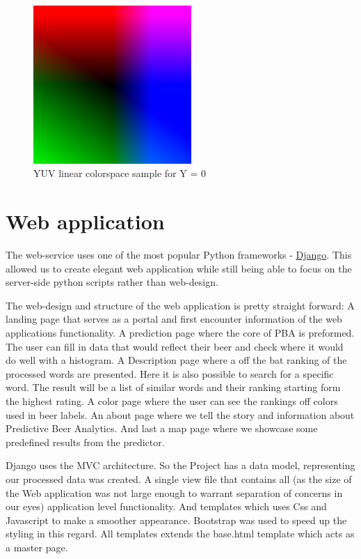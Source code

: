 \documentclass[10pt]{IEEEtran}
\begin{document}
\begin{figure}[t]
  \centering
  \includegraphics[width=6cm]{./graphics/YUV.png}
  \caption{YUV linear colorspace sample for Y = 0}
  \label{fig:colorspace}
\end{figure}

\section{Web application}

The web-service uses one of the most popular Python frameworks - \href{https://www.djangoproject.com/}{Django}. This allowed us to create elegant web application while still being able to focus on the server-side python scripts rather than web-design.

The web-design and structure of the web application is pretty straight forward:
A landing page that serves as a portal and first encounter information of the web applications functionality.
A prediction page where the core of PBA is preformed.
The user can fill in data that would reflect their beer and check where it would do well with a histogram.
A Description page where a off the bat ranking of the processed words are presented.
Here it is also possible to search for a specific word.
The result will be a list of similar words and their ranking starting form the highest rating.
A color page where the user can see the rankings off colors used in beer labels.
An about page where we tell the story and information about Predictive Beer Analytics.
And last a map page where we showcase some predefined results from the predictor.

Django uses the MVC architecture. So the Project has a data model, representing our processed data was created.
A single view file that contains all (as the size of the Web application was not large enough to warrant separation of concerns in our eyes) application level functionality. And templates which uses Css and Javascript to make a smoother appearance.
Bootstrap was used to speed up the styling in this regard. All templates extends the base.html template which
acts as a master page.
\end{document}

